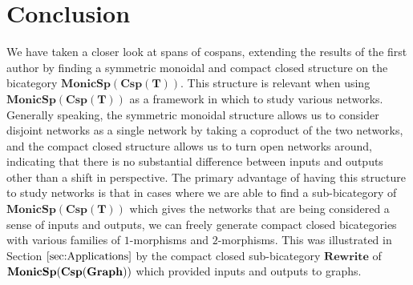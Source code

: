 \documentclass[11pt]{amsart}
\newcommand{\cat}[1]{\mathbf{#1}}
\newcommand{\bimonspcsp}[1]{\mathbf{MonicSp(Csp(#1))}}
\theoremstyle{remark}
\theoremstyle{definition}
\begin{document}
\section{Conclusion} %
\label{sec:Conclusion}

We have taken a closer look at 
spans of cospans, 
extending the results of
the first author \cite{Cic}
by finding a symmetric monoidal
and compact closed structure
on the bicategory $\bimonspcsp{T}$.
This structure is relevant
when using $\bimonspcsp{T}$ as 
a framework in which to study
various networks.  Generally speaking,
the symmetric monoidal structure
allows us to consider disjoint networks
as a single network by taking a coproduct of the two networks,
and the compact closed structure allows us 
to turn open networks around, 
indicating that there is no
substantial difference between
inputs and outputs
other than a shift in perspective.  
The primary advantage of 
having this structure 
to study networks is that
in cases where we are able to find a sub-bicategory
of $\bimonspcsp{T}$
which gives the networks that are being considered
a sense of
inputs and outputs,
we can freely generate compact closed
bicategories with various families
of $1$-morphisms and $2$-morphisms.
This was illustrated
in Section $\ref{sec:Applications}$
by the compact closed sub-bicategory
$\cat{Rewrite}$ of $\bold{MonicSp(Csp(Graph))}$
which provided inputs and outputs 
to graphs.


%
%
\end{document}
